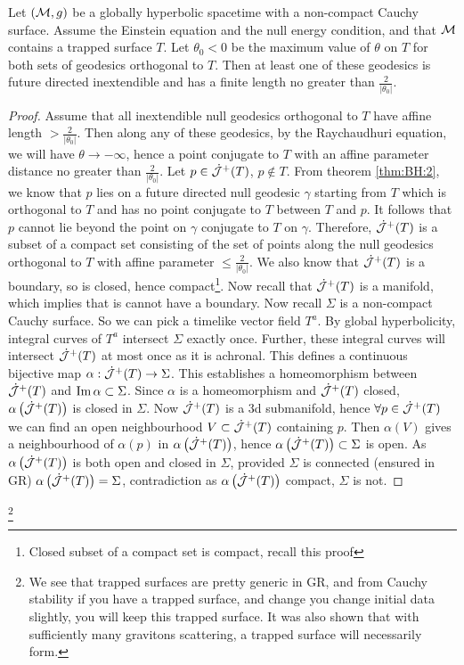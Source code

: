 \documentclass{article}
\begin{document}
\begin{theorem}
Let $(\mathcal{M},g)$ be a globally hyperbolic spacetime with a non-compact Cauchy surface. Assume the Einstein equation and the null energy condition, and that $\mathcal{M}$ contains a trapped surface $T$. Let $\theta_0<0$ be the maximum value of $\theta$ on $T$ for both sets of geodesics orthogonal to $T$. Then at least one of these geodesics is future directed inextendible and has a finite length no greater than $\frac{2}{|\theta_0|}$. 
\end{theorem}
\begin{proof}
Assume that all inextendible null geodesics orthogonal to $T$ have affine length $>\frac{2}{|\theta_0|}$. Then along any of these geodesics, by the Raychaudhuri equation, we will have $\theta \to -\infty$, hence a point conjugate to $T$ with an affine parameter distance no greater than $\frac{2}{|\theta_0|}$. Let $p\in \dot{\mathcal{J}}^+(T)$, $p\not\in T$. From theorem \ref{thm:BH:2}, we know that $p$ lies on a future directed null geodesic $\gamma$ starting from $T$ which is orthogonal to $T$ and has no point conjugate to $T$ between $T$ and $p$. It follows that $p$ cannot lie beyond the point on $\gamma$ conjugate to $T$ on $\gamma$. Therefore, $\dot{\mathcal{J}}^+(T)$ is a subset of a compact set consisting of the set of points along the null geodesics orthogonal to $T$ with affine parameter $\leq \frac{2}{|\theta_0|}$. We also know that $\dot{\mathcal{J}}^+(T)$ is a boundary, so is closed, hence compact\footnote{Closed subset of a compact set is compact, recall this proof}. Now recall that $\dot{\mathcal{J}}^+(T)$ is a manifold, which implies that is cannot have a boundary. Now recall $\Sigma$ is a non-compact Cauchy surface. So we can pick a timelike vector field $T^a$. By global hyperbolicity, integral curves of $T^a$ intersect $\Sigma$ exactly once. Further, these integral curves will intersect $\dot{\mathcal{J}}^+(T)$ at most once as it is achronal. This defines a continuous bijective map $\alpha : \dot{\mathcal{J}}^+(T) \to \Sigma $. This establishes a homeomorphism between $\dot{\mathcal{J}}^+(T)$ and $\operatorname{Im} \alpha \subset \Sigma$. Since $\alpha$ is a homeomorphism and $\dot{\mathcal{J}}^+(T)$ closed, $\alpha\left( \dot{\mathcal{J}}^+(T) \right)$ is closed in $\Sigma$. Now $\dot{\mathcal{J}}^+(T)$ is a 3d submanifold, hence $\forall p \in \dot{\mathcal{J}}^+(T)$ we can find an open neighbourhood $V\subset \dot{\mathcal{J}}^+(T)$ containing $p$. Then $\alpha(V)$ gives a neighbourhood of $\alpha(p)$ in $\alpha\left( \dot{\mathcal{J}}^+(T) \right)$, hence $\alpha\left( \dot{\mathcal{J}}^+(T) \right)\subset\Sigma$ is open. As $\alpha\left( \dot{\mathcal{J}}^+(T) \right)$ is both open and closed in $\Sigma$, provided $\Sigma$ is connected (ensured in GR) $\alpha\left( \dot{\mathcal{J}}^+(T) \right)=\Sigma$, contradiction as $\alpha\left( \dot{\mathcal{J}}^+(T) \right)$ compact, $\Sigma$ is not. 
\end{proof}\footnote{We see that trapped surfaces are pretty generic in GR, and from Cauchy stability if you have a trapped surface, and change you change initial data slightly, you will keep this trapped surface. It was also shown that with sufficiently many gravitons scattering, a trapped surface will necessarily form. }
\end{document}
